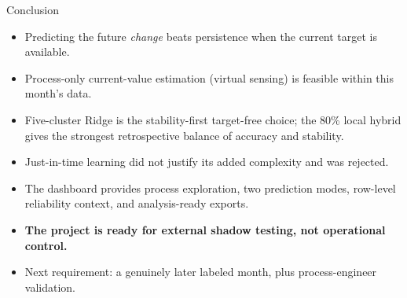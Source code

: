 \documentclass[11pt,aspectratio=169]{beamer}
\begin{document}
\begin{frame}{Conclusion}
\begin{itemize}
    \item Predicting the future \emph{change} beats persistence when the current target is available.
    \item Process-only current-value estimation (virtual sensing) is feasible within this month's data.
    \item Five-cluster Ridge is the stability-first target-free choice; the 80\% local hybrid gives the strongest retrospective balance of accuracy and stability.
    \item Just-in-time learning did not justify its added complexity and was rejected.
    \item The dashboard provides process exploration, two prediction modes, row-level reliability context, and analysis-ready exports.
    \item \textbf{The project is ready for external shadow testing, not operational control.}
    \item Next requirement: a genuinely later labeled month, plus process-engineer validation.
\end{itemize}
\end{frame}
\end{document}
